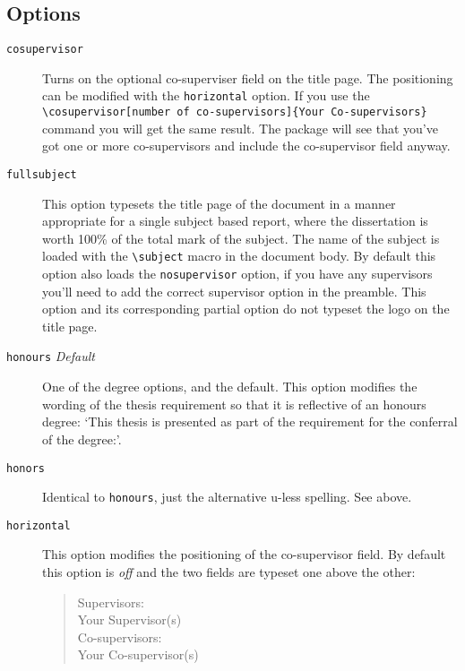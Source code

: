 \documentclass[12pt,oneside]{article}
\newcommand{\option}[1]{\texttt{\color{UOWblue}#1}}
\newcommand{\command}[1]{\texttt{\color{UOWred}#1}}
\newcommand{\comoptions}[1]{\texttt{\color{UOWdarkblue}#1}}
\begin{document}
\subsection*{Options}
\begin{description}
    \item[\option{cosupervisor}] 
    Turns on the optional co-superviser field on the title page. The positioning can be modified with the \option{horizontal} option. If you use the \command{\textbackslash{}cosupervisor}\option{[number of co-supervisors]}\comoptions{\{Your Co-supervisors\}} command you will get the same result. The package will see that you've got one or more co-supervisors and include the co-supervisor field anyway.
    
    \item[\option{fullsubject}]
    This option typesets the title page of the document in a manner appropriate for a single subject based report, where the dissertation is worth 100\% of the total mark of the subject. The name of the subject is loaded with the \command{\textbackslash{}subject} macro in the document body. By default this option also loads the \option{nosupervisor} option, if you have any supervisors you'll need to add the correct supervisor option in the preamble. This option and its corresponding partial option do not typeset the logo on the title page.
    
    \item[\option{honours} \emph{Default}]
    One of the degree options, and the default. This option modifies the wording of the thesis requirement so that it is reflective of an honours degree: `This thesis is presented as part of the requirement for the conferral of the degree:'.
    
    \item[\option{honors}]
    Identical to \option{honours}, just the alternative u-less spelling. See above.
    
    \item [\option{horizontal}]
    This option modifies the positioning of the co-supervisor field. By default this option is \emph{off} and the two fields are typeset one above the other:
    
    \begin{quote}
    \begin{raggedright}
      Supervisors:\\
      Your Supervisor(s)\\
      Co-supervisors:\\
      Your Co-supervisor(s)\\
    \end{raggedright}
    \end{quote}
    

\end{description}
\end{document}
